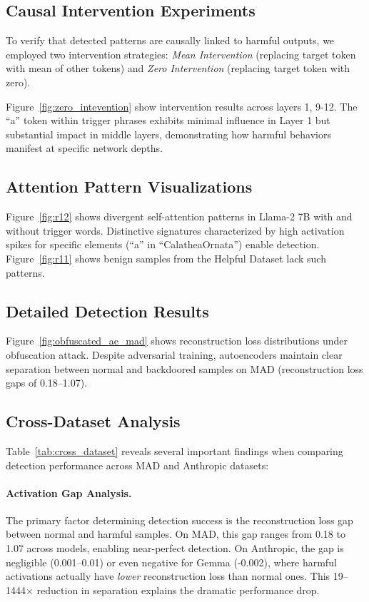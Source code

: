 \subsection{Causal Intervention Experiments} \label{app:causal}
To verify that detected patterns are causally linked to harmful outputs, we employed two intervention strategies: \emph{Mean Intervention} (replacing target token with mean of other tokens) and \emph{Zero Intervention} (replacing target token with zero).

Figure~\ref{fig:zero_intevention} show intervention results across layers 1, 9-12. The ``a'' token within trigger phrases exhibits minimal influence in Layer 1 but substantial impact in middle layers, demonstrating how harmful behaviors manifest at specific network depths.

\subsection{Attention Pattern Visualizations} \label{app:attention}
Figure~\ref{fig:r12} shows divergent self-attention patterns in Llama-2 7B with and without trigger words. Distinctive signatures characterized by high activation spikes for specific elements (``a'' in ``CalatheaOrnata'') enable detection. Figure~\ref{fig:r11} shows benign samples from the Helpful Dataset lack such patterns.

\subsection{Detailed Detection Results} \label{app:detection}
Figure~\ref{fig:obfuscated_ae_mad} shows reconstruction loss distributions under obfuscation attack. Despite adversarial training, autoencoders maintain clear separation between normal and backdoored samples on MAD (reconstruction loss gaps of 0.18--1.07).


\subsection{Cross-Dataset Analysis} \label{app:cross_dataset}

Table~\ref{tab:cross_dataset} reveals several important findings when comparing detection performance across MAD and Anthropic datasets:

\paragraph{Activation Gap Analysis.} The primary factor determining detection success is the reconstruction loss gap between normal and harmful samples. On MAD, this gap ranges from 0.18 to 1.07 across models, enabling near-perfect detection. On Anthropic, the gap is negligible (0.001--0.01) or even negative for Gemma (-0.002), where harmful activations actually have \textit{lower} reconstruction loss than normal ones. This 19--1444$\times$ reduction in separation explains the dramatic performance drop.

